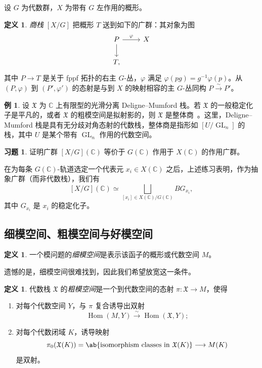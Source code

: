 \documentclass{amsart}
\theoremstyle{definition}
\newtheorem{defn}[thm]{定义}
\newtheorem{exm}[thm]{例}
\newtheorem{exer}[thm]{习题}
\theoremstyle{remark}
\theoremstyle{plain}
\theoremstyle{definition}
\theoremstyle{remark}
\newcommand{\C}{\mathbb{C}}
\newcommand{\mf}[1]{\mathfrak{#1}}
\newcommand{\on}[1]{\operatorname{#1}}
\newcommand{\1}{\mathbf{1}}
\newcommand{\2}{\mathbf{2}}
\newcommand{\3}{\mathbf{3}}
\begin{document}
设 \(G\) 为代数群，\(X\) 为带有 \(G\) 左作用的概形。

\begin{defn}
    \textit{商栈} \([X/G]\) 把概形 \(T\) 送到如下的广群：其对象为图
    \begin{equation*}
    \begin{tikzcd}
        P \ar{r}{\varphi} \ar{d} & X \\
        T,
    \end{tikzcd}
    \end{equation*}
    其中 \(P\to T\) 是关于 fppf 拓扑的右主 \(G\)-丛，\(\varphi\) 满足 \(\varphi(pg)=g^{-1}\varphi(p)\)。从 \((P,\varphi)\) 到 \((P',\varphi')\) 的态射是与到 \(X\) 的映射相容的主 \(G\)-丛同构 \(P\xrightarrow{\sim}P'\)。
\end{defn}

\begin{exm}
    设 \(\mf{X}\) 为 \(\C\) 上有限型的光滑分离 Deligne–Mumford 栈。若 \(\mf{X}\) 的一般稳定化子是平凡的，或者 \(\mf{X}\) 的粗模空间是拟射影的，则 \(\mf{X}\) 是整体商~\cite{EHKV2001}。这里，Deligne–Mumford 栈是具有无分歧对角态射的代数栈，整体商是指形如 \([U/\on{GL}_n]\) 的栈，其中 \(U\) 是某个带有 \(\on{GL}_n\) 作用的代数空间。
\end{exm}

\begin{exer}
    证明广群 \([X/G](\C)\) 等价于 \(G(\C)\) 作用于 \(X(\C)\) 的作用广群。
\end{exer}

在为每条 \(G(\C)\)-轨道选定一个代表元 \(x_i\in X(\C)\) 之后，上述练习表明，作为抽象广群（而非代数栈），我们有
\[ 
    [X/G](\C) \simeq \bigsqcup_{[x_i] \in X(\C)/G(\C)} BG_{x_i}, 
\]
其中 \(G_{x_i}\) 是 \(x_i\) 的稳定化子。


\subsection{细模空间、粗模空间与好模空间}%
\label{sub:Fine vs coarse vs good moduli spaces}

\begin{defn}
    一个模问题的\textit{细模空间}是表示该函子的概形或代数空间 \(M\)。 
\end{defn}

遗憾的是，细模空间很难找到，因此我们希望放宽这一条件。

\begin{defn}
    代数栈 \(\mf{X}\) 的\textit{粗模空间}是一个到代数空间的态射 \(\pi\colon\mf{X}\to M\)，使得
    \begin{enumerate}
        \item 对每个代数空间 \(Y\)，与 \(\pi\) 复合诱导出双射
        \[
            \on{Hom}(M,Y)\xrightarrow{\sim}\on{Hom}(\mf{X},Y);
        \]
        \item 对每个代数闭域 \(K\)，诱导映射
        \[
            \pi_0(\mf{X}(K))=\ab\{\text{isomorphism classes in }\mf{X}(K)\}
            \longrightarrow M(K)
        \]
        是双射。
    \end{enumerate}
\end{defn}
\end{document}
